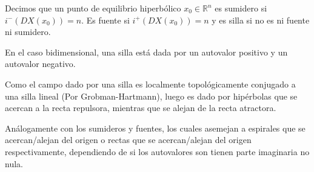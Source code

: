 \begin{defn}
	Decimos que un punto de equilibrio hiperbólico $x_0\in \mathbb{R}^n$ es sumidero si $i^-(DX(x_0)) = n$. Es fuente si $i^+(DX(x_0)) = n$ y es silla si no es ni fuente ni sumidero.
\end{defn}

\begin{rmrk}
	En el caso bidimensional, una silla está dada por un autovalor positivo y un autovalor negativo.
	
	Como el campo dado por una silla es localmente topológicamente conjugado a una silla lineal (Por Grobman-Hartmann), luego es dado por hipérbolas que se acercan a la recta repulsora, mientras que se alejan de la recta atractora.
	
	Análogamente con los sumideros y fuentes, los cuales asemejan a espirales que se acercan/alejan del origen o rectas que se acercan/alejan del origen respectivamente, dependiendo de si los autovalores son tienen parte imaginaria no nula.
\end{rmrk}



